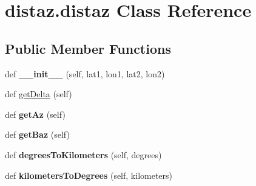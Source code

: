 \hypertarget{classdistaz_1_1distaz}{}\section{distaz.\+distaz Class Reference}
\label{classdistaz_1_1distaz}
\subsection*{Public Member Functions}
\begin{DoxyCompactItemize}
\item 
\hypertarget{classdistaz_1_1distaz_a3231d7c0c826a7ef6a55a8a29ac12754}{}def {\bfseries \+\_\+\+\_\+init\+\_\+\+\_\+} (self, lat1, lon1, lat2, lon2)\label{classdistaz_1_1distaz_a3231d7c0c826a7ef6a55a8a29ac12754}

\item 
def \hyperlink{classdistaz_1_1distaz_aaf19992df4c732632dab22da80b965f4}{get\+Delta} (self)
\item 
\hypertarget{classdistaz_1_1distaz_ad92d84e3ee3b87da25f9bec3bd6b92c8}{}def {\bfseries get\+Az} (self)\label{classdistaz_1_1distaz_ad92d84e3ee3b87da25f9bec3bd6b92c8}

\item 
\hypertarget{classdistaz_1_1distaz_a4843fc9f9977b886267436912ecf9f3c}{}def {\bfseries get\+Baz} (self)\label{classdistaz_1_1distaz_a4843fc9f9977b886267436912ecf9f3c}

\item 
\hypertarget{classdistaz_1_1distaz_af322cca275b999e4ed565e0ff0e82e8d}{}def {\bfseries degrees\+To\+Kilometers} (self, degrees)\label{classdistaz_1_1distaz_af322cca275b999e4ed565e0ff0e82e8d}

\item 
\hypertarget{classdistaz_1_1distaz_a59bf5d4ec6d59fc766fea31a11d7ec56}{}def {\bfseries kilometers\+To\+Degrees} (self, kilometers)\label{classdistaz_1_1distaz_a59bf5d4ec6d59fc766fea31a11d7ec56}

\end{DoxyCompactItemize}
